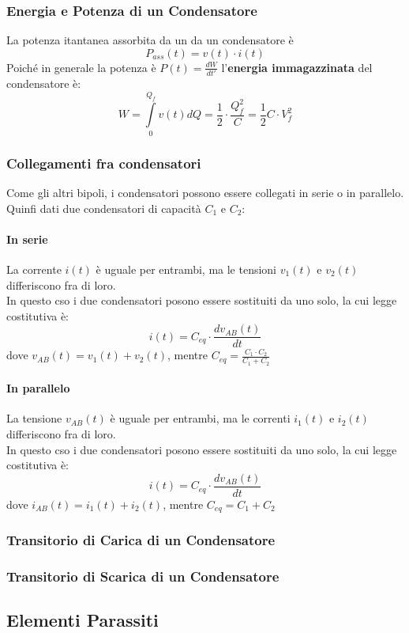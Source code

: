 \documentclass[../main.tex]{subfiles}
\begin{document}
	\subsubsection{Energia e Potenza di un Condensatore}
	La potenza itantanea assorbita da un da un condensatore è
	\[P_{ass}(t) = v(t) \cdot i(t) \]
	Poiché in generale la potenza è $P(t) = \frac{dW}{dt'}$ l'\textbf{energia immagazzinata} del condensatore è: 
	\[W = \int\limits_{0}^{Q_f} v(t) dQ = \frac{1}{2} \cdot \frac{Q_f^2}{C} = \frac{1}{2} C \cdot V_f^2\]
	\subsubsection{Collegamenti fra condensatori}
	Come gli altri bipoli, i condensatori possono essere collegati in serie o in parallelo.\\
	Quinfi dati due condensatori di capacità $C_1$ e $C_2$:
	\paragraph{In serie}
	La corrente $i(t)$ è uguale per entrambi, ma le tensioni $v_1(t)$ e $v_2(t)$ differiscono fra di loro.\\
	In questo cso i due condensatori posono essere sostituiti da uno solo, la cui legge costitutiva è:
	\[i(t) = C_{eq} \cdot \frac{dv_{AB}(t)}{dt}\]
	dove $v_{AB}(t) = v_1(t) + v_2(t)$, mentre $C_{eq} = \frac{C_1 \cdot C_2}{C_1 + C_2}$
	\paragraph{In parallelo}
	La tensione $v_{AB}(t)$ è uguale per entrambi, ma le correnti $i_1(t)$ e $i_2(t)$ differiscono fra di loro.\\
	In questo cso i due condensatori posono essere sostituiti da uno solo, la cui legge costitutiva è:
	\[i(t) = C_{eq} \cdot \frac{dv_{AB}(t)}{dt}\]
	dove $i_{AB}(t) = i_1(t) + i_2(t)$, mentre $C_{eq} = C_1 + C_2$
	\subsubsection{Transitorio di Carica di un Condensatore}
	
	\subsubsection{Transitorio di Scarica di un Condensatore}
	\subsection{Elementi Parassiti}
\end{document}
